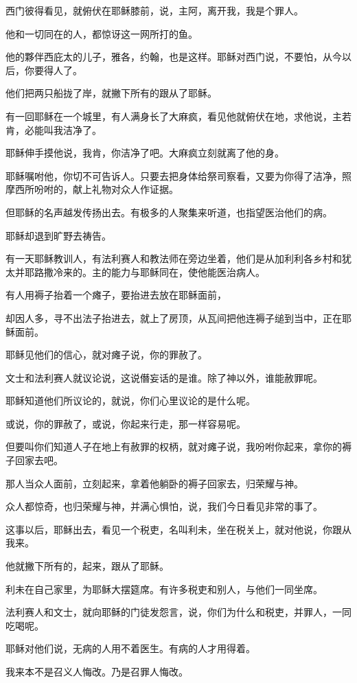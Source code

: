 \documentclass[12pt,oneside]{book}
\begin{document}
西门彼得看见，就俯伏在耶稣膝前，说，主阿，离开我，我是个罪人。

他和一切同在的人，都惊讶这一网所打的鱼。

他的夥伴西庇太的儿子，雅各，约翰，也是这样。耶稣对西门说，不要怕，从今以后，你要得人了。

他们把两只船拢了岸，就撇下所有的跟从了耶稣。

有一回耶稣在一个城里，有人满身长了大麻疯，看见他就俯伏在地，求他说，主若肯，必能叫我洁净了。

耶稣伸手摸他说，我肯，你洁净了吧。大麻疯立刻就离了他的身。

耶稣嘱咐他，你切不可告诉人。只要去把身体给祭司察看，又要为你得了洁净，照摩西所吩咐的，献上礼物对众人作证据。

但耶稣的名声越发传扬出去。有极多的人聚集来听道，也指望医治他们的病。

耶稣却退到旷野去祷告。

有一天耶稣教训人，有法利赛人和教法师在旁边坐着，他们是从加利利各乡村和犹太并耶路撒冷来的。主的能力与耶稣同在，使他能医治病人。

有人用褥子抬着一个瘫子，要抬进去放在耶稣面前，

却因人多，寻不出法子抬进去，就上了房顶，从瓦间把他连褥子缒到当中，正在耶稣面前。

耶稣见他们的信心，就对瘫子说，你的罪赦了。

文士和法利赛人就议论说，这说僭妄话的是谁。除了神以外，谁能赦罪呢。

耶稣知道他们所议论的，就说，你们心里议论的是什么呢。

或说，你的罪赦了，或说，你起来行走，那一样容易呢。

但要叫你们知道人子在地上有赦罪的权柄，就对瘫子说，我吩咐你起来，拿你的褥子回家去吧。

那人当众人面前，立刻起来，拿着他躺卧的褥子回家去，归荣耀与神。

众人都惊奇，也归荣耀与神，并满心惧怕，说，我们今日看见非常的事了。

这事以后，耶稣出去，看见一个税吏，名叫利未，坐在税关上，就对他说，你跟从我来。

他就撇下所有的，起来，跟从了耶稣。

利未在自己家里，为耶稣大摆筵席。有许多税吏和别人，与他们一同坐席。

法利赛人和文士，就向耶稣的门徒发怨言，说，你们为什么和税吏，并罪人，一同吃喝呢。

耶稣对他们说，无病的人用不着医生。有病的人才用得着。

我来本不是召义人悔改。乃是召罪人悔改。
\end{document}

